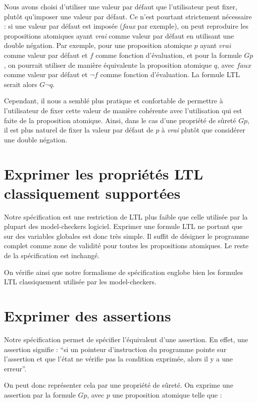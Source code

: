 Nous avons choisi d'utiliser une valeur par défaut que l'utilisateur peut fixer,
plutôt qu'imposer une valeur par défaut. Ce n'est pourtant strictement
nécessaire : si une valeur par défaut est imposée (\emph{faux} par exemple), on
peut reproduire les propositions atomiques ayant \emph{vrai} comme valeur par
défaut en utilisant une double négation. Par exemple, pour une proposition
atomique \(p\) ayant \(vrai\) comme valeur par défaut et \(f\) comme fonction
d'évaluation, et pour la formule \(G p\), on pourrait utiliser de manière
équivalente la proposition atomique \(q\), avec \(faux\) comme valeur par défaut
et \(\lnot f\) comme fonction d'évaluation. La formule LTL serait alors \(G
\lnot q\).

Cependant, il nous a semblé plus pratique et confortable de permettre à
l'utilisateur de fixer cette valeur de manière cohérente avec
l'utilisation qui est faite de la proposition atomique. Ainsi, dans le
cas d'une propriété de sûreté \(G p\), il est plus naturel de fixer la
valeur par défaut de \(p\) à \emph{vrai} plutôt que considérer une
double négation.

\section{Exprimer les propriétés LTL classiquement supportées}

Notre spécification est une restriction de \ac{LTL} plus faible que celle utilisée
par la plupart des model-checkers logiciel. Exprimer une formule \ac{LTL} ne
portant que sur des variables globales est donc très simple. Il suffit de
désigner le programme complet comme zone de validité pour toutes les
propositions atomiques. Le reste de la spécification est inchangé.

On vérifie ainsi que notre formalisme de spécification englobe bien les formules
\ac{LTL} classiquement utilisée par les model-checkers.

\section{Exprimer des assertions}

Notre spécification permet de spécifier l'équivalent d'une assertion. En
effet, une assertion signifie : ``si un pointeur d'instruction du
programme pointe sur l'assertion et que l'état ne vérifie pas la
condition exprimée, alors il y a une erreur''.

On peut donc représenter cela par une propriété de sûreté. On exprime
une assertion par la formule \(G p\), avec \(p\) une proposition
atomique telle que :

